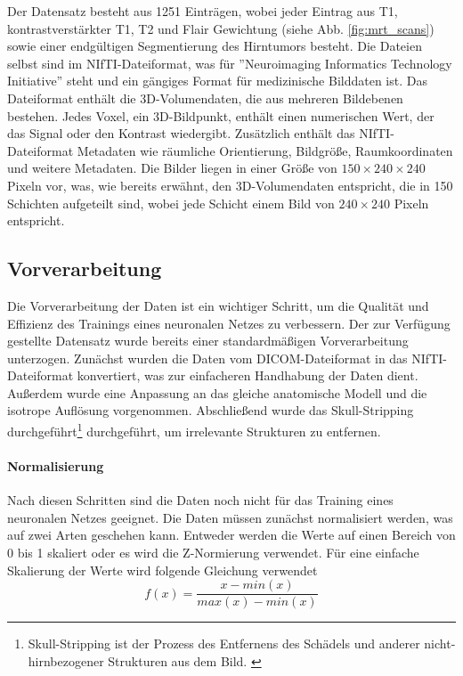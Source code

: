 Der Datensatz besteht aus 1251 Einträgen, wobei jeder Eintrag aus T1, kontrastverstärkter T1, T2 und Flair Gewichtung (siehe Abb. \ref{fig:mrt_scans}) sowie einer endgültigen Segmentierung des Hirntumors besteht. Die Dateien selbst sind im NIfTI-Dateiformat, was für ''Neuroimaging Informatics Technology Initiative'' steht und ein gängiges Format für medizinische Bilddaten ist. Das Dateiformat enthält die 3D-Volumendaten, die aus mehreren Bildebenen bestehen. Jedes Voxel, ein 3D-Bildpunkt, enthält einen numerischen Wert, der das Signal oder den Kontrast wiedergibt. Zusätzlich enthält das NIfTI-Dateiformat Metadaten wie räumliche Orientierung, Bildgröße, Raumkoordinaten und weitere Metadaten. \cite[][]{NIfTI} Die Bilder liegen in einer Größe von $150\times240\times240$ Pixeln vor, was, wie bereits erwähnt, den 3D-Volumendaten entspricht, die in 150 Schichten aufgeteilt sind, wobei jede Schicht einem Bild von  $240\times240$ Pixeln entspricht.

\subsection{Vorverarbeitung}
\label{subsec:Vorverarbeitung}
Die Vorverarbeitung der Daten ist ein wichtiger Schritt, um die Qualität und Effizienz des Trainings eines neuronalen Netzes zu verbessern. Der zur Verfügung gestellte Datensatz wurde bereits einer standardmäßigen Vorverarbeitung unterzogen. Zunächst wurden die Daten vom DICOM-Dateiformat in das NIfTI-Dateiformat konvertiert, was zur einfacheren Handhabung der Daten dient. Außerdem wurde eine Anpassung an das gleiche anatomische Modell und die isotrope Auflösung vorgenommen. Abschließend wurde das Skull-Stripping durchgeführt\footnote{Skull-Stripping ist der Prozess des Entfernens des Schädels und anderer nicht-hirnbezogener Strukturen aus dem Bild. \cite[vgl.][]{SwiebockaWiek2016}} durchgeführt, um irrelevante Strukturen zu entfernen. \cite[vgl.][]{Baid2021}

\paragraph{Normalisierung}
Nach diesen Schritten sind die Daten noch nicht für das Training eines neuronalen Netzes geeignet. Die Daten müssen zunächst normalisiert werden, was auf zwei Arten geschehen kann. Entweder werden die Werte auf einen Bereich von 0 bis 1 skaliert oder es wird die Z-Normierung verwendet. Für eine einfache Skalierung der Werte wird folgende Gleichung verwendet
\begin{equation}
	f(x)=\frac{x - min(x)}{max(x) - min(x)}
\end{equation}

